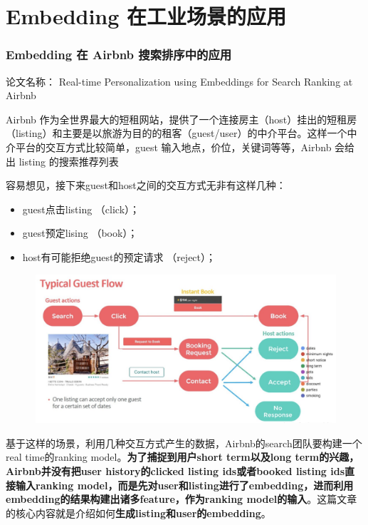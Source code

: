 \documentclass[12pt]{article}
\begin{document}
\part{Embedding 在工业场景的应用}
\section{Embedding 在 Airbnb 搜索排序中的应用
\cite{Embedding_In_Realtime_Search_In_Airbnb}\cite{How_Airbnb_Solve_Sparse_Problem_In_Embedding}}
论文名称： Real-time Personalization using Embeddings for Search Ranking at Airbnb 

Airbnb 作为全世界最大的短租网站，提供了一个连接房主（host）挂出的短租房（listing）和主要是以旅游为目的的租客（guest/user）的中介平台。这样一个中介平台的交互方式比较简单，guest 输入地点，价位，关键词等等，Airbnb 会给出 listing 的搜索推荐列表

容易想见，接下来guest和host之间的交互方式无非有这样几种：
\begin{itemize}
\setlength{\itemsep}{0pt}
\setlength{\parsep}{0pt}
\setlength{\parskip}{0pt}
    \item guest点击listing （click）；
    \item guest预定lising （book）；
    \item host有可能拒绝guest的预定请求 （reject）；
\end{itemize}
\begin{figure}[H]
    \centering
    \includegraphics[width=1\textwidth]{fig/Airbnb_User_Interaction.png}
\end{figure}

基于这样的场景，利用几种交互方式产生的数据，Airbnb的search团队要构建一个real time的ranking model。\textbf{为了捕捉到用户short term以及long term的兴趣，Airbnb并没有把user history的clicked listing ids或者booked listing ids直接输入ranking model，而是先对user和listing进行了embedding，进而利用embedding的结果构建出诸多feature，作为ranking model的输入}。这篇文章的核心内容就是介绍如何\textbf{生成listing和user的embedding}。
\end{document}
